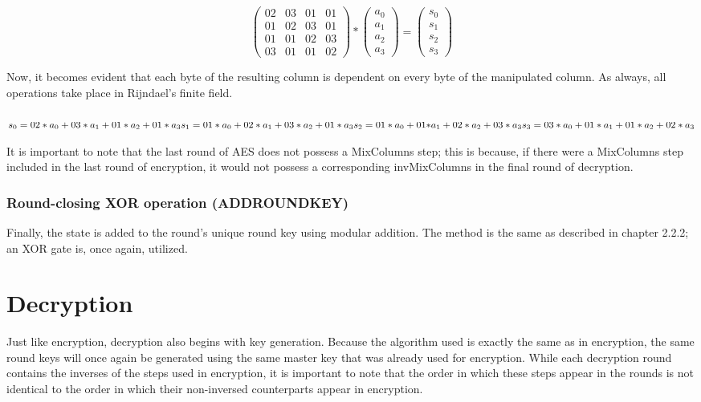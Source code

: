 \documentclass[12pt]{report}
\theoremstyle{definition}
\theoremstyle{remark}
\begin{document}
\[ \left( \begin{array}{cccc}
02 & 03 & 01 & 01 \\
01 & 02 & 03 & 01 \\
01 & 01 & 02 & 03 \\
03 & 01 & 01 & 02\end{array} \right)
*
\left( \begin{array}{c}
a_0 \\
a_1 \\
a_2 \\
a_3\end{array} \right)
=
\left( \begin{array}{c}
s_0 \\
s_1 \\
s_2 \\
s_3\end{array} \right)
\]

Now, it becomes evident that each byte of the resulting column is dependent on every byte of the manipulated column. As always, all operations take place in Rijndael's finite field. \\
\\
$
s_0 = {02}*a_0+{03}*a_1+{01}*a_2+{01}*a_3 \\
s_1 = {01}*a_0+{02}*a_1+{03}*a_2+{01}*a_3 \\
s_2 = {01}*a_0+{01*}a_1+{02}*a_2+{03}*a_3 \\
s_3 = {03}*a_0+{01}*a_1+{01}*a_2+{02}*a_3 \\ $

It is important to note that the last round of AES does not possess a MixColumns step; this is because, if there were a MixColumns step included in the last round of encryption, it would not possess a corresponding invMixColumns in the final round of decryption\cite{NoMixColumns}.

\subsubsection{Round-closing XOR operation (ADDROUNDKEY)}
Finally, the state is added to the round's unique round key using modular addition. The method is the same as described in chapter 2.2.2; an XOR gate is, once again, utilized.

\section{Decryption}
Just like encryption, decryption also begins with key generation. Because the algorithm used is exactly the same as in encryption, the same round keys will once again be generated using the same master key that was already used for encryption. While each decryption round contains the inverses of the steps used in encryption, it is important to note that the order in which these steps appear in the rounds is not identical to the order in which their non-inversed counterparts appear in encryption.
\end{document}
